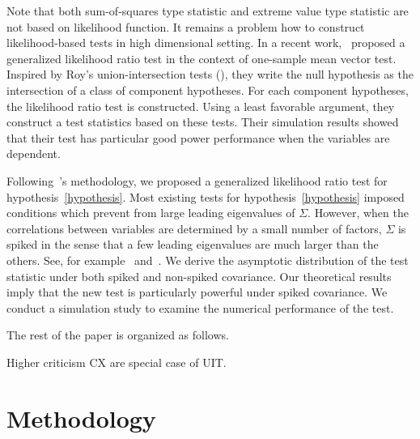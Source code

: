 \documentclass[review]{elsarticle}
\theoremstyle{plain}
\theoremstyle{definition}
\theoremstyle{remark}
\begin{document}
   Note that both sum-of-squares type statistic and extreme value type statistic are not based on likelihood function.
    It remains a problem how to construct likelihood-based tests in high dimensional setting.
    In a recent work,~\cite{Zhao2016A} proposed a generalized likelihood ratio test in the context of one-sample mean vector test.
Inspired by Roy's union-intersection tests (\cite{Roy1953}),
    they write the null hypothesis as the intersection of a class of component hypotheses. For each component hypotheses, the likelihood ratio test is constructed. Using a least favorable argument, they construct a test statistics based on these tests.
    Their simulation results showed that their test has particular good power performance when the variables are dependent.

    Following~\cite{Zhao2016A}'s methodology, we proposed a generalized likelihood ratio test for hypothesis~\eqref{hypothesis}.
    Most existing tests for hypothesis~\eqref{hypothesis} imposed conditions which prevent from large leading eigenvalues of $\Sigma$.
    However, when the correlations between variables are determined by a small number of factors, $\Sigma$ is spiked in the sense that a few leading eigenvalues are much larger than the others. See, for example~\cite{Cai2012Sparse} and~\cite{Shen2013Consistency}.
    We derive the asymptotic distribution of the test statistic under both spiked and non-spiked covariance.
    Our theoretical results imply that the new test is particularly powerful under spiked covariance.
    We conduct a simulation study to examine the numerical performance of the test.

    The rest of the paper is organized  as follows.

    Higher criticism CX are special case of UIT.
    
\section{Methodology}
\end{document}
